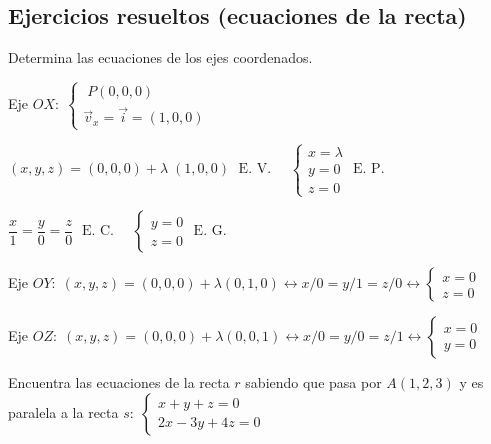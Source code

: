 \subsection{Ejercicios resueltos (ecuaciones de la recta)}

\begin{ejre}
Determina las ecuaciones de los ejes coordenados.	
\end{ejre}

\begin{proofw}\renewcommand{\qedsymbol}{$\diamond$}

Eje $OX:\; \begin{cases} \; P(0,0,0) \\ \vec v_x=\vec i=(1,0,0)\end{cases}$

\noindent $(x,y,z)=(0,0,0)+ \lambda\; (1,0,0) \;\text{ E. V. } \quad \begin{cases} x=\lambda\\y=0\\z=0 \end{cases} \text { E. P.}$

\noindent $\dfrac{x}{1}=\dfrac{y}{0}=\dfrac{z}{0} 	\;\text{ E. C. } \quad \begin{cases} y=0\\z=0 \end{cases} \text{ E. G. }$

\noindent Eje $OY:\; (x,y,z)=(0,0,0)+\lambda(0,1,0) \leftrightarrow x/0=y/1=z/0 \leftrightarrow \begin{cases} x=0\\z=0 \end{cases}$

\noindent Eje $OZ:\; (x,y,z)=(0,0,0)+\lambda(0,0,1) \leftrightarrow x/0=y/0=z/1 \leftrightarrow \begin{cases} x=0\\y=0 \end{cases}$
	
\end{proofw}

\begin{ejre}
Encuentra las ecuaciones de la recta $r$ sabiendo que pasa por $A(1,2,3)$ y es paralela a la recta $s:\; \begin{cases} x+y+z=0\\2x-3y+4z=0 \end{cases}$	
\end{ejre}

